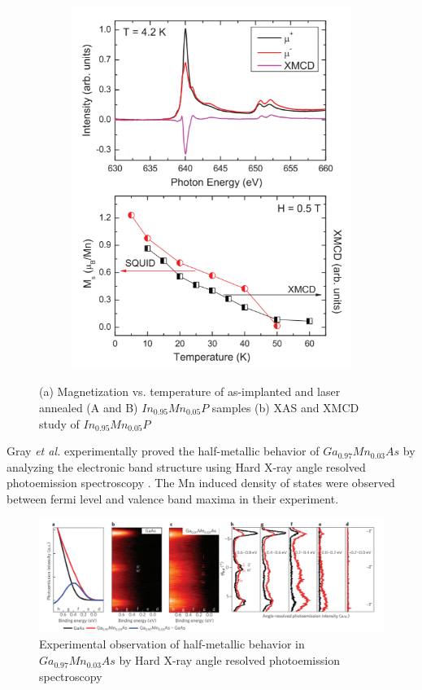 \documentclass[main.tex]{subfiles}
\begin{document}
\begin{figure}[!htb]
\begin{subfigure}[h]{0.47\textwidth}
  		\includegraphics[width=\linewidth]{khalid2}
  		\caption{}
	\end{subfigure}
\caption{(a) Magnetization vs. temperature of as-implanted and laser annealed (A and B) $In_{0.95}Mn_{0.05}P$ samples (b) XAS and XMCD study of $In_{0.95}Mn_{0.05}P$ \cite{khalid2014ferromagnetism}} 
\label{fig:fig}

\end{figure}
\FloatBarrier

Gray \textit{et al.} experimentally proved the half-metallic behavior of $Ga_{0.97}Mn_{0.03}As$ by analyzing the electronic band structure using Hard X-ray angle resolved photoemission spectroscopy \cite{gray2012bulk}. The Mn induced density of states were observed between fermi level and valence band maxima in their experiment.

\begin{figure}[!htb]
	\centering
	\includegraphics[width=0.99\linewidth]{gray}
	\caption{Experimental observation of half-metallic behavior in $Ga_{0.97}Mn_{0.03}As$ by Hard X-ray angle resolved photoemission spectroscopy \cite{gray2012bulk}}
	\label{fig:TEM_PT}
\end{figure}
\FloatBarrier
\end{document}
